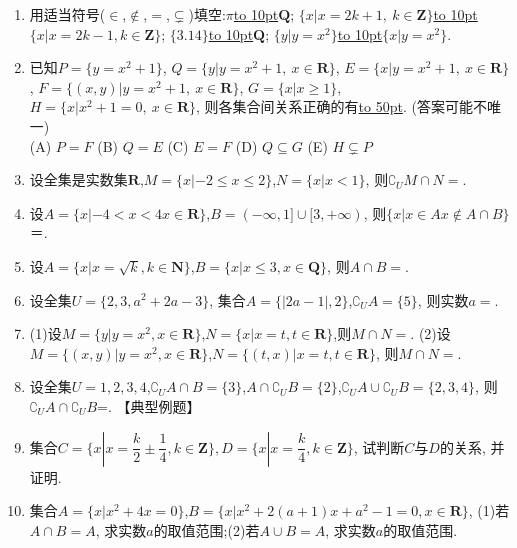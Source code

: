 \documentclass[10pt,a4paper]{article}
\newcommand{\blank}[1]{\underline{\hbox to #1pt{}}}
\begin{document}
\begin{enumerate}[1.]
\item 用适当符号($\in$,$\notin$,$=$,$\subsetneq$)填空:$\pi$\blank{10}$\mathbf{Q}$; $\{x|x=2k+1, \ k\in \mathbf{Z}\}$\blank{10}$\{x|x=2k-1,k\in \mathbf{Z}\}$; $\{3.14\}$\blank{10}$\mathbf{Q}$; $\{y|y=x^2\}$\blank{10}$\{x|y=x^2\}$.  
\item 已知$P=\{y=x^2+1\}$, $Q=\{y|y=x^2+1, \ x\in \mathbf{R}\}$, $E=\{x|y=x^2+1, \  x\in \mathbf{R}\}$, $F=\{(x,y)|y=x^2+1, \ x\in \mathbf{R}\}$, $G=\{x|x\ge 1\}$, $H=\{x|x^2+1=0, \ x\in \mathbf{R}\}$, 则各集合间关系正确的有\blank{50}. (答案可能不唯一)\\
(A) $P=F$   (B) $Q=E$   (C) $E=F$   (D) $Q\subseteq G$  (E) $H\subsetneq P$

\item 设全集是实数集$\mathbf{R}$,$M=\{x|-2 \le x\le 2 \}$,$N=\{x|x<1 \}$, 则$\complement {_U}M\cap N=$.
\item 设$A=\{ x|-4<x<4x\in \mathbf{R} \}$,$B=(-\infty ,1]\cup [3,+\infty)$, 则$\{ x| x\in Ax\notin A\cap B  \}$＝.
\item 设$A=\{ x|x=\sqrt k,k\in \mathbf{N} \}$,$B=\{ x|x\le 3,x\in \mathbf{Q} \}$, 则$A\cap B=$.
\item 设全集$U=\{2,3,{a^2}+2a-3 \}$, 集合$A=\{|2a-1|,2 \}$,$\complement {_U}A{=}\{ 5 \}$, 则实数$a=$.
\item (1)设$M=\{ y|y={x^2},x\in \mathbf{R} \}$,$N=\{ x|x=t,t\in \mathbf{R} \}$,则$M\cap N=$.
(2)设$M=\{ (x,y)|y={x^2},x\in \mathbf{R} \}$,$N=\{ (t,x)|x=t,t\in \mathbf{R} \}$, 则$M\cap N=$.
\item 设全集$U={1, 2, 3, 4}$,$\complement {_U}A\cap B=\{ 3 \}$,$A\cap \complement {_U}B=\{ 2 \}$,$\complement {_U}A\cup \complement {_U}B=\{ 2,3,4 \}$, 则$\complement {_U}A\cap \complement {_U}B$=.
【典型例题】
\item 集合$C=\{ x| x=\dfrac k2\pm \dfrac14,k\in \mathbf{Z}  \},D=\{ x| x=\dfrac k4,k\in \mathbf{Z}  \}$, 试判断$C$与$D$的关系, 并证明.
\item 集合$A=\{x| {x^2}+4x=0 \}$,$B=\{x| {x^2}+2(a+1)x+{a^2}-1=0,x\in \mathbf{R}\}$, (1)若$A\cap B=A$, 求实数$a$的取值范围;(2)若$A\cup B=A$, 求实数$a$的取值范围.
 

\end{enumerate}
\end{document}
